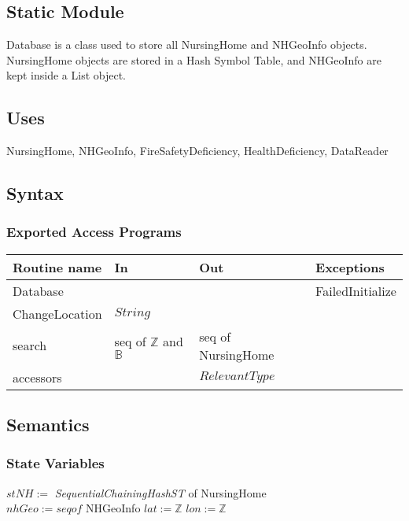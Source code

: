 \documentclass[12pt]{article}
\begin{document}
\subsection* {Static Module}

Database is a class used to store all NursingHome and NHGeoInfo objects. NursingHome objects are stored in a Hash Symbol Table, and NHGeoInfo are kept inside a List object.

\subsection*{Uses}
NursingHome, NHGeoInfo, FireSafetyDeficiency, HealthDeficiency, DataReader

\subsection* {Syntax}

\subsubsection* {Exported Access Programs}

\begin{tabular}{| l | l | l | p{6cm} |}
\hline
\textbf{Routine name} & \textbf{In} & \textbf{Out} & \textbf{Exceptions}\\
\hline
Database & ~ & ~ & FailedInitialize\\
\hline
ChangeLocation & $String$ & ~ & ~\\
\hline
search & seq of $\mathbb{Z}$ and $\mathbb{B}$ & seq of NursingHome & ~\\
\hline
accessors & ~ & $RelevantType$ & ~\\
\hline
\end{tabular}

\subsection* {Semantics}

\subsubsection* {State Variables}
\noindent $stNH := $ \textit{SequentialChainingHashST} of NursingHome \\
\noindent $nhGeo := seq of $ NHGeoInfo
\noindent $lat := \mathbb{Z}$
\noindent $lon := \mathbb{Z}$
\end{document}
